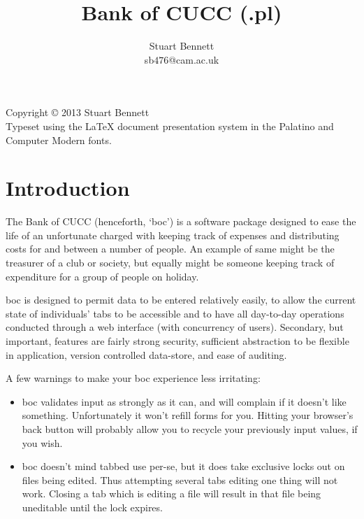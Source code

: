 \documentclass{report}
\begin{document}

\title{Bank of CUCC (.pl)}
\author{Stuart Bennett\\\normalsize{sb$476$@cam.ac.uk}}
\maketitle

\clearpage
\null\vspace{4cm}


Copyright \copyright{} 2013 Stuart Bennett
\vspace{5cm}\\
Typeset using the \LaTeX{} document presentation system in the Palatino and Computer Modern fonts.

\cleardoublepage
{}
\tableofcontents

\chapter{Introduction}

The Bank of CUCC (henceforth, `boc') is a software package designed to ease the life of an unfortunate charged with keeping track of expenses and distributing costs for and between a number of people.  An example of same might be the treasurer of a club or society, but equally might be someone keeping track of expenditure for a group of people on holiday.

boc is designed to permit data to be entered relatively easily, to allow the current state of individuals' tabs to be accessible and to have all day-to-day operations conducted through a web interface (with concurrency of users).  Secondary, but important, features are fairly strong security, sufficient abstraction to be flexible in application, version controlled data-store, and ease of auditing.

A few warnings to make your boc experience less irritating:
\begin{itemize}
\item boc validates input as strongly as it can, and will complain if it doesn't like something.  Unfortunately it won't refill forms for you.  Hitting your browser's back button will probably allow you to recycle your previously input values, if you wish.
\item boc doesn't mind tabbed use per-se, but it does take exclusive locks out on files being edited.  Thus attempting several tabs editing one thing will not work.  Closing a tab which is editing a file will result in that file being uneditable until the lock expires.
\end{itemize}
\end{document}
